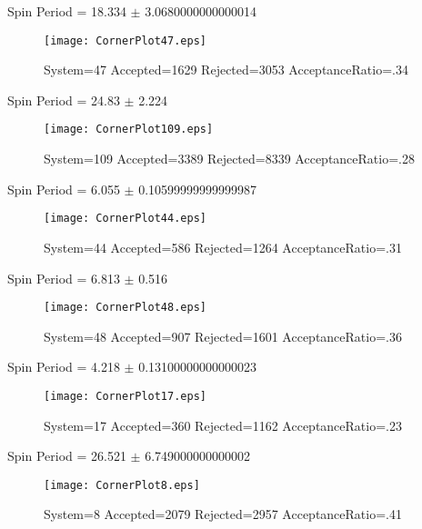 \documentclass[10pt]{article}
\begin{document}
\newpage
\begin{center}
        Spin Period = 18.334 $\pm$ 3.0680000000000014
        \end{center}
\begin{figure}[H] 
        \texttt{[image: CornerPlot47.eps]}
        \caption{System=47 Accepted=1629 Rejected=3053 AcceptanceRatio=.34}
        \label{S47}
        \centering
        \end{figure}
\newpage
\begin{center}
        Spin Period = 24.83 $\pm$ 2.224
        \end{center}
\begin{figure}[H] 
        \texttt{[image: CornerPlot109.eps]}
        \caption{System=109 Accepted=3389 Rejected=8339 AcceptanceRatio=.28}
        \label{S109}
        \centering
        \end{figure}
\newpage
\begin{center}
        Spin Period = 6.055 $\pm$ 0.10599999999999987
        \end{center}
\begin{figure}[H] 
        \texttt{[image: CornerPlot44.eps]}
        \caption{System=44 Accepted=586 Rejected=1264 AcceptanceRatio=.31}
        \label{S44}
        \centering
        \end{figure}
\newpage
\begin{center}
        Spin Period = 6.813 $\pm$ 0.516
        \end{center}
\begin{figure}[H] 
        \texttt{[image: CornerPlot48.eps]}
        \caption{System=48 Accepted=907 Rejected=1601 AcceptanceRatio=.36}
        \label{S48}
        \centering
        \end{figure}
\newpage
\begin{center}
        Spin Period = 4.218 $\pm$ 0.13100000000000023
        \end{center}
\begin{figure}[H] 
        \texttt{[image: CornerPlot17.eps]}
        \caption{System=17 Accepted=360 Rejected=1162 AcceptanceRatio=.23}
        \label{S17}
        \centering
        \end{figure}
\newpage
\begin{center}
        Spin Period = 26.521 $\pm$ 6.749000000000002
        \end{center}
\begin{figure}[H] 
        \texttt{[image: CornerPlot8.eps]}
        \caption{System=8 Accepted=2079 Rejected=2957 AcceptanceRatio=.41}
        \label{S8}
        \centering
        \end{figure}
\end{document}
